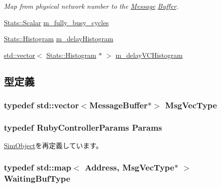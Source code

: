 \begin{DoxyCompactItemize}
\begin{DoxyCompactList}\small\item\em Map from physical network number to the \hyperlink{classMessage}{Message} \hyperlink{classBuffer}{Buffer}. \item\end{DoxyCompactList}\item 
\hyperlink{classStats_1_1Scalar}{Stats::Scalar} \hyperlink{classAbstractController_a0de33847c40bca29af78bf6c48a40e0c}{m\_\-fully\_\-busy\_\-cycles}
\item 
\hyperlink{classStats_1_1Histogram}{Stats::Histogram} \hyperlink{classAbstractController_a32315b21a536469475414901e05bfe36}{m\_\-delayHistogram}
\item 
\hyperlink{classstd_1_1vector}{std::vector}$<$ \hyperlink{classStats_1_1Histogram}{Stats::Histogram} $\ast$ $>$ \hyperlink{classAbstractController_aba317e33c2fc730b07d01be02e743bd7}{m\_\-delayVCHistogram}
\end{DoxyCompactItemize}


\subsection{型定義}
\hypertarget{classAbstractController_a7c9a43de9f27c3319add6df9c0d2e948}{
\subsubsection[{MsgVecType}]{\setlength{\rightskip}{0pt plus 5cm}typedef {\bf std::vector}$<${\bf MessageBuffer}$\ast$$>$ {\bf MsgVecType}}}
\label{classAbstractController_a7c9a43de9f27c3319add6df9c0d2e948}
\hypertarget{classAbstractController_a8dd24df4fce13403813bb4f7243a3b13}{
\subsubsection[{Params}]{\setlength{\rightskip}{0pt plus 5cm}typedef RubyControllerParams {\bf Params}}}
\label{classAbstractController_a8dd24df4fce13403813bb4f7243a3b13}


\hyperlink{classSimObject_a0f0761d2db586a23bb2a2880b8f387bb}{SimObject}を再定義しています。\hypertarget{classAbstractController_afcfa4bb0b120bb22dce11fc367b702af}{
\subsubsection[{WaitingBufType}]{\setlength{\rightskip}{0pt plus 5cm}typedef std::map$<$ {\bf Address}, {\bf MsgVecType}$\ast$ $>$ {\bf WaitingBufType}}}
\label{classAbstractController_afcfa4bb0b120bb22dce11fc367b702af}


